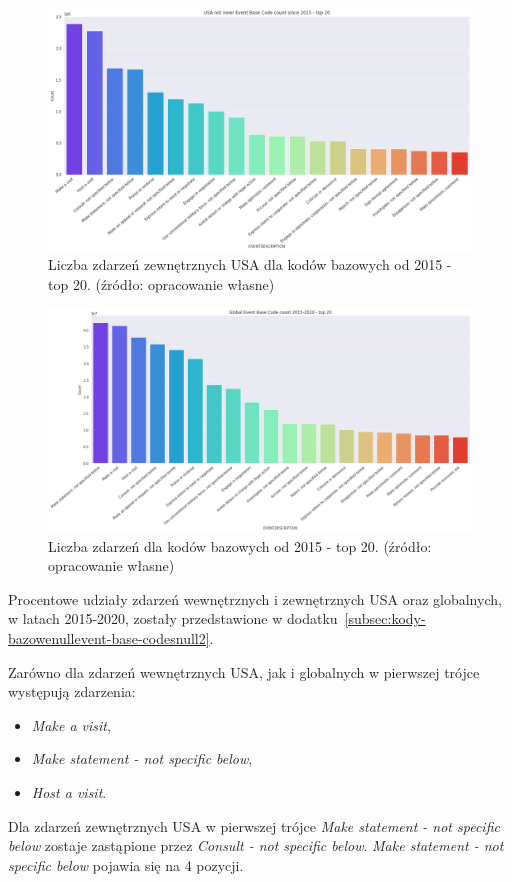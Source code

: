\documentclass[11pt]{report}
\begin{document}
    \begin{figure}[!htp]
        \centering
        \includegraphics[width=\linewidth]{fig/USA not inner/EBC.png}
        \caption{Liczba zdarzeń zewnętrznych USA dla kodów bazowych od 2015 - top 20. (źródło: opracowanie własne)}
        \label{fig:USA_not_inner_EBC}
    \end{figure}

    \begin{figure}[!htp]
        \centering
        \includegraphics[width=\linewidth]{fig/GLOBAL//EBC.png}
        \caption{Liczba zdarzeń dla kodów bazowych od 2015 - top 20. (źródło: opracowanie własne)}
        \label{fig:GLOBAL_EBC}
    \end{figure}

    Procentowe udziały zdarzeń wewnętrznych i zewnętrznych USA oraz globalnych, w latach 2015-2020, zostały przedstawione
    w dodatku~\ref{subsec:kody-bazowenullevent-base-codesnull2}.

    Zarówno dla zdarzeń wewnętrznych USA, jak i globalnych w pierwszej trójce występują zdarzenia:
    \begin{itemize}
        \item \textit{Make a visit},
        \item \textit{Make statement - not specific below},
        \item \textit{Host a visit}.
    \end{itemize}
    Dla zdarzeń zewnętrznych USA w pierwszej trójce \textit{Make statement - not specific below} zostaje zastąpione przez \textit{Consult - not specific below}.
    \textit{Make statement - not specific below} pojawia się na 4 pozycji.
\end{document}
